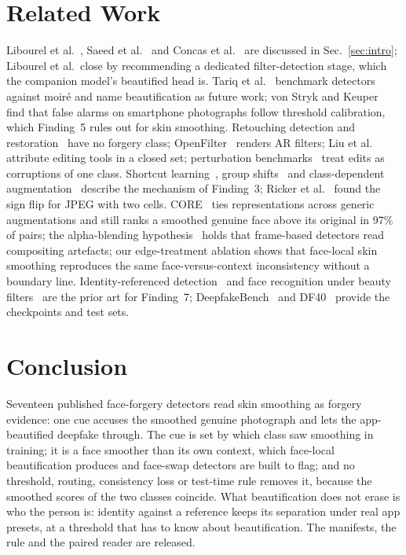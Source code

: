\documentclass[conference]{IEEEtran}
\begin{document}
\section{Related Work}
\label{sec:related}
Libourel et al.~\cite{libourel2024}, Saeed et al.~\cite{saeed2025} and Concas et al.~\cite{concas2025} are discussed in
Sec.~\ref{sec:intro}; Libourel et al.\ close by recommending a dedicated filter-detection stage, which the companion model's
beautified head is. Tariq et al.~\cite{moire2025} benchmark detectors against moir\'e and name beautification as future work; von Stryk and
Keuper~\cite{laionmobile2026} find that false alarms on smartphone photographs follow threshold calibration, which Finding~5
rules out for skin smoothing. Retouching detection and
restoration~\cite{bharati2016,jain2018,wang2019photoshop,retouchingffhq,frrffusion,mofrr,reface} have no forgery class;
OpenFilter~\cite{openfilter2022} renders AR filters; Liu et al.~\cite{miea2026} attribute editing tools in a closed set;
perturbation benchmarks~\cite{deeperforensics2020,hendrycks2019} treat edits as corruptions of one class. Shortcut
learning~\cite{geirhos2020}, group shifts~\cite{sagawa2020} and class-dependent augmentation~\cite{balestriero2022} describe
the mechanism of Finding~3; Ricker et al.~\cite{ricker2026biasid} found the sign flip for JPEG with two cells. CORE~\cite{core}
ties representations across generic augmentations and still ranks a smoothed genuine face above its original in 97\% of
pairs; the alpha-blending hypothesis~\cite{alphablend2026} holds that frame-based detectors read compositing artefacts; our
edge-treatment ablation shows that face-local skin smoothing reproduces the same face-versus-context inconsistency without a
boundary line. Identity-referenced detection~\cite{idreveal2021,ict2022,yin2026} and face
recognition under beauty filters~\cite{mirabet2025} are the prior art for Finding~7; DeepfakeBench~\cite{deepfakebench} and
DF40~\cite{df40} provide the checkpoints and test sets.

\section{Conclusion}
Seventeen published face-forgery detectors read skin smoothing as forgery evidence: one cue accuses the smoothed genuine
photograph and lets the app-beautified deepfake through. The cue is set by which class saw smoothing in training; it is a face
smoother than its own context, which face-local beautification produces and face-swap detectors are built to flag; and no
threshold, routing, consistency loss or test-time rule removes it, because the smoothed scores of the two classes coincide.
What beautification does not erase is who the person is: identity against a reference keeps its separation under real app
presets, at a threshold that has to know about beautification. The manifests, the rule and the paired reader are released.



\end{document}
